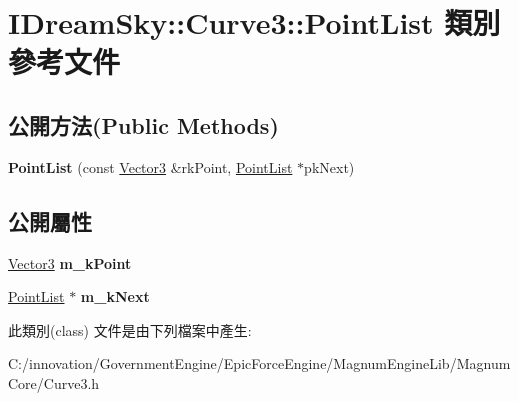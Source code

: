 \hypertarget{class_i_dream_sky_1_1_curve3_1_1_point_list}{}\section{I\+Dream\+Sky\+:\+:Curve3\+:\+:Point\+List 類別 參考文件}
\label{class_i_dream_sky_1_1_curve3_1_1_point_list}
\subsection*{公開方法(Public Methods)}
\begin{DoxyCompactItemize}
\item 
{\bfseries Point\+List} (const \hyperlink{class_i_dream_sky_1_1_vector3}{Vector3} \&rk\+Point, \hyperlink{class_i_dream_sky_1_1_curve3_1_1_point_list}{Point\+List} $\ast$pk\+Next)\hypertarget{class_i_dream_sky_1_1_curve3_1_1_point_list_aa817a916d13a43a4be36fbbaa3dbf043}{}\label{class_i_dream_sky_1_1_curve3_1_1_point_list_aa817a916d13a43a4be36fbbaa3dbf043}

\end{DoxyCompactItemize}
\subsection*{公開屬性}
\begin{DoxyCompactItemize}
\item 
\hyperlink{class_i_dream_sky_1_1_vector3}{Vector3} {\bfseries m\+\_\+k\+Point}\hypertarget{class_i_dream_sky_1_1_curve3_1_1_point_list_af30153ad00930da1df171a6547c1da5e}{}\label{class_i_dream_sky_1_1_curve3_1_1_point_list_af30153ad00930da1df171a6547c1da5e}

\item 
\hyperlink{class_i_dream_sky_1_1_curve3_1_1_point_list}{Point\+List} $\ast$ {\bfseries m\+\_\+k\+Next}\hypertarget{class_i_dream_sky_1_1_curve3_1_1_point_list_aeb98597bbccf712c141cb836da998f30}{}\label{class_i_dream_sky_1_1_curve3_1_1_point_list_aeb98597bbccf712c141cb836da998f30}

\end{DoxyCompactItemize}


此類別(class) 文件是由下列檔案中產生\+:\begin{DoxyCompactItemize}
\item 
C\+:/innovation/\+Government\+Engine/\+Epic\+Force\+Engine/\+Magnum\+Engine\+Lib/\+Magnum\+Core/Curve3.\+h\end{DoxyCompactItemize}
